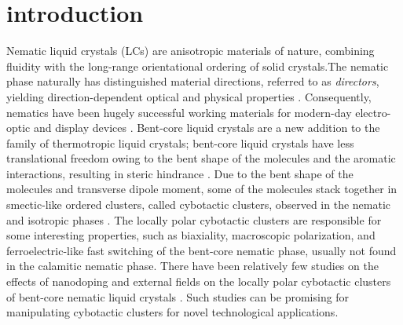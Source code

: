 \documentclass[reprint,amsfonts,amsmath,amssymb,aps,pre,floatfix,10pt]{revtex4-1}
\begin{document}
\section{introduction}
Nematic liquid crystals (LCs) are anisotropic materials of nature, combining fluidity with the long-range orientational ordering of solid crystals.The nematic phase naturally has distinguished material directions, referred to as \emph{directors}, yielding direction-dependent optical and physical properties \cite{de1993physics_2}. Consequently, nematics have been hugely successful working materials for modern-day electro-optic and display devices \cite{collings2019introduction_1, de1993physics_2}. Bent-core liquid crystals are a new addition to the family of thermotropic liquid crystals; bent-core liquid crystals have less translational freedom owing to the bent shape of the molecules and the aromatic interactions, resulting in steric hindrance \cite{marino2012dielectric_3, ghosh2014ferroelectric_4}. Due to the bent shape of the molecules and transverse dipole moment, some of the molecules stack together in smectic-like ordered clusters, called cybotactic clusters, observed in the nematic and isotropic phases \cite{bailey2009rheological_5}. The locally polar cybotactic clusters are responsible for some interesting properties, such as biaxiality, macroscopic polarization, and ferroelectric-like fast switching \cite{takezoe2006bent_6, francescangeli2014cybotactic_7, keith2010nematic_8, kumar2018ferroelectric_9} of the bent-core nematic phase, usually not found in the calamitic nematic phase. There have been relatively few studies on the effects of nanodoping and external fields on the locally polar cybotactic clusters of bent-core nematic liquid crystals \cite{kumar2018quantum_10,khan2017elastic_11,kumar2018nanodoping_12}. Such studies can be promising for manipulating cybotactic clusters for novel technological applications.
\end{document}
